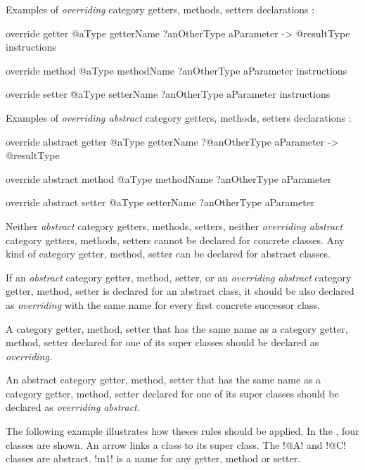 Examples of \emph{overriding} category getters, methods, setters declarations :
\begin{galgas4}
override getter @aType getterName
  ?anOtherType aParameter
  -> @resultType
{
  instructions
}

override method @aType methodName
  ?anOtherType aParameter
{
  instructions
}

override setter @aType setterName
  ?anOtherType aParameter
{
  instructions
}
\end{galgas4}


Examples of \emph{overriding abstract} category getters, methods, setters declarations :
\begin{galgas4}
override abstract getter @aType getterName
  ?@anOtherType aParameter
  -> @resultType

override abstract method @aType methodName
  ?anOtherType aParameter

override abstract setter @aType setterName
  ?anOtherType aParameter

\end{galgas4}



Neither \emph{abstract} category getters, methods, setters, neither \emph{overriding abstract} category getters, methods, setters cannot be declared for concrete classes. Any kind of category getter, method, setter can be declared for abstract classes.

If an \emph{abstract} category getter, method, setter, or an \emph{overriding abstract} category getter, method, setter is declared for an abstract class, it should be also declared as \emph{overriding} with the same name for every first concrete successor class.

A category getter, method, setter that has the same name as a category getter, method, setter declared for one of its super classes should be declared as \emph{overriding}.

An abstract category getter, method, setter that has the same name as a category getter, method, setter declared for one of its super classes should be declared as \emph{overriding abstract}.

The following example illustrates how theses rules should be applied. In the , four classes are shown. An arrow links a class to its super class. The \ggsq!@A! and \ggsq!@C! classes are abstract. \ggsq!m1! is a name for any getter, method or setter.

